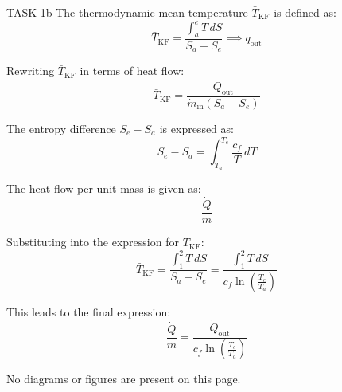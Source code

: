 TASK 1b  
The thermodynamic mean temperature \( \bar{T}_{\text{KF}} \) is defined as:  
\[
\bar{T}_{\text{KF}} = \frac{\int_a^e T \, dS}{S_a - S_e} \implies q_{\text{out}}
\]  

Rewriting \( \bar{T}_{\text{KF}} \) in terms of heat flow:  
\[
\bar{T}_{\text{KF}} = \frac{\dot{Q}_{\text{out}}}{\dot{m}_{\text{in}} (S_a - S_e)}
\]  

The entropy difference \( S_e - S_a \) is expressed as:  
\[
S_e - S_a = \int_{T_a}^{T_e} \frac{c_f}{T} \, dT
\]  

The heat flow per unit mass is given as:  
\[
\frac{\dot{Q}}{m}
\]  

Substituting into the expression for \( \bar{T}_{\text{KF}} \):  
\[
\bar{T}_{\text{KF}} = \frac{\int_1^2 T \, dS}{S_a - S_e} = \frac{\int_1^2 T \, dS}{c_f \ln \left( \frac{T_e}{T_a} \right)}
\]  

This leads to the final expression:  
\[
\frac{\dot{Q}}{m} = \frac{\dot{Q}_{\text{out}}}{c_f \ln \left( \frac{T_e}{T_a} \right)}
\]  

No diagrams or figures are present on this page.